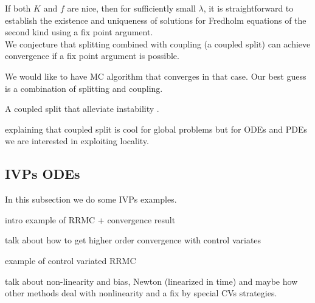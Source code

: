\documentclass[a4paper,12pt]{article}
\begin{document}





If both $K$ and $f$ are nice, then for sufficiently small $\lambda$,
it is straightforward to establish the existence and uniqueness of solutions
for Fredholm equations of the second kind using a fix point argument. \\

We conjecture that splitting combined with coupling (a coupled split) can achieve
convergence if a fix point argument is possible.

We would like to have MC algorithm that converges in that case. Our best guess is
a combination of splitting and coupling.



\begin{example}
    A coupled split that alleviate instability  .
\end{example}

explaining that coupled split is cool for global problems but for
ODEs and PDEs we are interested in exploiting locality.

\subsection{IVPs ODEs}
In this subsection we do some IVPs examples.

\begin{example}[RRMC $y'=y$]
    intro example of RRMC + convergence result
\end{example}

talk about how to get higher order convergence with
control variates

\begin{example}[control RRMC $y'=y$]
    example of control variated RRMC
\end{example}

talk about non-linearity and bias, Newton (linearized in time) and maybe
how other methods deal with nonlinearity and a fix by special CVs strategies.
\end{document}
